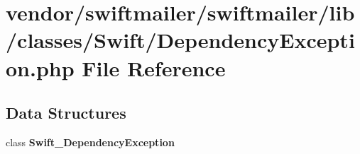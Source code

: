 \section{vendor/swiftmailer/swiftmailer/lib/classes/\+Swift/\+Dependency\+Exception.php File Reference}
\label{_dependency_exception_8php}
\subsection*{Data Structures}
\begin{DoxyCompactItemize}
\item 
class {\bf Swift\+\_\+\+Dependency\+Exception}
\end{DoxyCompactItemize}
